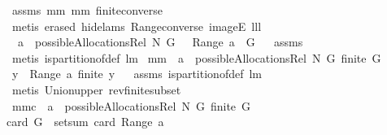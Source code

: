\begin{isabellebody}
%
\isadelimproof
%
\endisadelimproof
%
\isatagproof
{}\isamarkupfalse%
\ assms\ mm{}{}\ mm{}{}\ finite{\isacharunderscore}converse\ \isanewline
{}\isamarkupfalse%
\ {\isacharparenleft}metis\ {\isacharparenleft}erased{\isacharcomma}\ hide{\isacharunderscore}lams{\isacharparenright}\ Range{\isacharunderscore}converse\ imageE\ lll{}{}{\isacharparenright}%
\endisatagproof
{\isafoldproof}%
%
\isadelimproof
\isanewline
%
\endisadelimproof
\isanewline
{}\isamarkupfalse%
\ \ {\isachardoublequoteopen}a\ {\isasymin}\ possibleAllocationsRel\ N\ G{\isachardoublequoteclose}\ \ {\isachardoublequoteopen}{\isasymUnion}\ Range\ a\ {\isacharequal}\ G{\isachardoublequoteclose}%
\isadelimproof
\ %
\endisadelimproof
%
\isatagproof
{}\isamarkupfalse%
\ assms\ \isanewline
{}\isamarkupfalse%
\ {\isacharparenleft}metis\ is{\isacharunderscore}partition{\isacharunderscore}of{\isacharunderscore}def\ lm{}{}{\isacharparenright}%
\endisatagproof
{\isafoldproof}%
%
\isadelimproof
%
\endisadelimproof
\isanewline
\isanewline
{}\isamarkupfalse%
\ mm{}{}{\isacharcolon}\ \ {\isachardoublequoteopen}a\ {\isasymin}\ possibleAllocationsRel\ N\ G{\isachardoublequoteclose}\ {\isachardoublequoteopen}finite\ G{\isachardoublequoteclose}\ \isanewline
{\isachardoublequoteopen}{\isasymforall}\ y\ {\isasymin}\ Range\ a{\isachardot}\ finite\ y{\isachardoublequoteclose}%
\isadelimproof
\ %
\endisadelimproof
%
\isatagproof
{}\isamarkupfalse%
\ assms\ is{\isacharunderscore}partition{\isacharunderscore}of{\isacharunderscore}def\ lm{}{}\ \isamarkupfalse%
\ {\isacharparenleft}metis\ Union{\isacharunderscore}upper\ rev{\isacharunderscore}finite{\isacharunderscore}subset{\isacharparenright}%
\endisatagproof
{\isafoldproof}%
%
\isadelimproof
%
\endisadelimproof
\isanewline
\isanewline
{}\isamarkupfalse%
\ mm{}{}c{\isacharcolon}\ \ {\isachardoublequoteopen}a\ {\isasymin}\ possibleAllocationsRel\ N\ G{\isachardoublequoteclose}\ {\isachardoublequoteopen}finite\ G{\isachardoublequoteclose}\ \ \isanewline
{\isachardoublequoteopen}card\ G\ {\isacharequal}\ setsum\ card\ {\isacharparenleft}Range\ a{\isacharparenright}{\isachardoublequoteclose}%
\isadelimproof
\ %
\endisadelimproof
%
\isatagproof
{}\isamarkupfalse%

\end{isabellebody}
